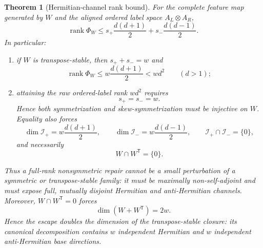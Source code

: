 \documentclass[11pt]{article}
\newtheorem{theorem}{Theorem}[section]
\newcommand{\rank}{\operatorname{rank}}
\newcommand{\transpose}{\mathsf T}
\begin{document}
\begin{theorem}[Hermitian-channel rank bound]
\label{thm:mixed-base-rank-bound}
For the complete feature map generated by $W$ and the aligned ordered
label space $A_L\otimes A_R$,
\begin{equation}
 \rank\Phi_W
 \le
 s_+\frac{d(d+1)}2+s_-\frac{d(d-1)}2.               \label{eq:mixed-base-cap}
\end{equation}
In particular:
\begin{enumerate}[label=(\alph*)]
\item if $W$ is transpose-stable, then $s_++s_-=w$ and
\begin{equation}
 \rank\Phi_W\le w\frac{d(d+1)}2<wd^2
 \qquad(d>1);                                      \label{eq:transpose-stable-W-cap}
\end{equation}
\item attaining the raw ordered-label rank $wd^2$ requires
\begin{equation}
 s_+=s_-=w.                                         \label{eq:both-projections-full}
\end{equation}
Hence both symmetrization and skew-symmetrization must be injective on $W$.
Equality also forces
\begin{equation}
 \dim\mathcal I_+=w\frac{d(d+1)}2,
 \qquad
 \dim\mathcal I_-=w\frac{d(d-1)}2,
 \qquad
 \mathcal I_+\cap\mathcal I_-=\{0\},             \label{eq:full-disjoint-channels}
\end{equation}
and necessarily
\begin{equation}
 W\cap W^\transpose=\{0\}.                         \label{eq:maximally-nonselfadjoint}
\end{equation}
\end{enumerate}
Thus a full-rank nonsymmetric repair cannot be a small perturbation of a
symmetric or transpose-stable family: it must be maximally
non-self-adjoint and must expose full, mutually disjoint Hermitian and
anti-Hermitian channels.  Moreover,
$W\cap W^\transpose=0$ forces
\begin{equation}
  \dim(W+W^\transpose)=2w.                        \label{eq:transpose-closure-doubles}
\end{equation}
Hence the escape doubles the dimension of the transpose-stable closure: its
canonical decomposition contains $w$ independent Hermitian and $w$
independent anti-Hermitian base directions.
\end{theorem}
\end{document}
